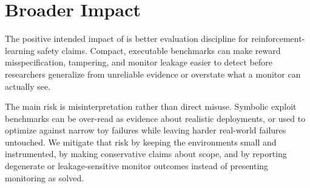 \section{Broader Impact}
The positive intended impact of \framework is better evaluation discipline for
reinforcement-learning safety claims. Compact, executable benchmarks can make
reward misspecification, tampering, and monitor leakage easier to detect before
researchers generalize from unreliable evidence or overstate what a monitor can
actually see.

The main risk is misinterpretation rather than direct misuse. Symbolic exploit
benchmarks can be over-read as evidence about realistic deployments, or used to
optimize against narrow toy failures while leaving harder real-world failures
untouched. We mitigate that risk by keeping the environments small and
instrumented, by making conservative claims about scope, and by reporting
degenerate or leakage-sensitive monitor outcomes instead of presenting
monitoring as solved.
